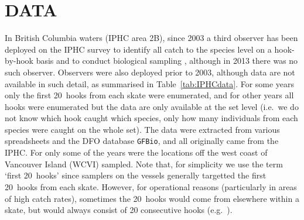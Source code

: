 
\section{DATA}

In British Columbia waters (IPHC area 2B), since 2003 a third observer has been
deployed on the IPHC survey to identify all catch to the species level on a
hook-by-hook basis and to conduct biological sampling \citep{fycd12}, although
in 2013 there was no such observer. Observers were also deployed prior to 2003,
although data are not available in such detail, as summarised in
Table~\ref{tab:IPHCdata}. For some years only the first 20~hooks from each skate
were enumerated, and for other years all hooks were enumerated but the data are
only available at the set level (i.e.~we do not know which hook caught which
species, only how many individuals from each species were caught on the whole
set). The data were extracted from various spreadsheets and the DFO database
{\tt GFBio}, and all originally came from the IPHC. For only some of the years
were the locations off the west coast of Vancouver Island (WCVI) sampled. Note
that, for simplicity we use the term `first 20~hooks' since samplers on the
vessels generally targetted the first 20~hooks from each skate. However, for
operational reasons (particularly in areas of high catch rates), sometimes the
20~hooks would come from elsewhere within a skate, but would always consist of
20 consecutive hooks (e.g.~\citealt{dvr02, dvr03}).
